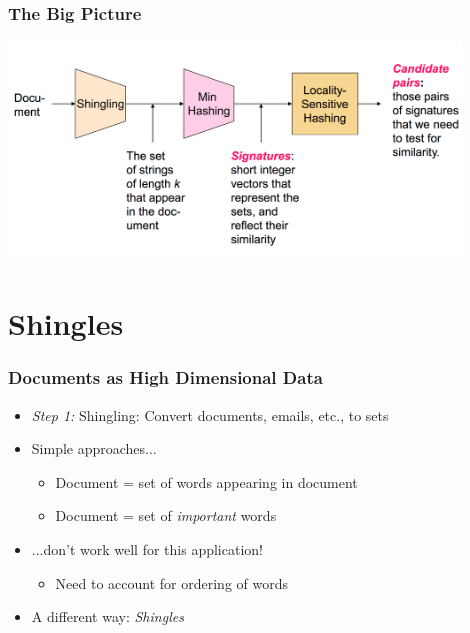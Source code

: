 \documentclass[svgnames]{beamer}
\begin{document}
  
\begin{frame} \frametitle{The Big Picture}

\includegraphics[width=12cm]{overall}

\end{frame}

  
\section{Shingles}

  
\begin{frame} \frametitle{Documents as High Dimensional Data}

\begin{itemize}
\item \emph{Step 1:} Shingling: Convert documents, emails, etc., to sets

\item Simple approaches...
   \begin{itemize}
   \item Document = set of words appearing in document
   \item Document = set of {\it important} words
   \end{itemize}
\item ...don’t work well for this application!
   \begin{itemize}
   \item Need to account for ordering of words
   \end{itemize}

\item A different way: \emph{Shingles}
\end{itemize}

\end{frame}

  
\end{document}

